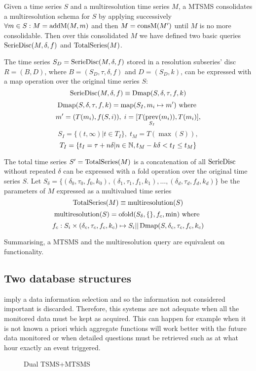 Given a time series $S$ and a multiresolution time series $M$, a MTSMS
consolidates a multiresolution schema for $S$ by applying successively
$\forall m \in S: M=\operatorname{addM}(M,m)$ and then $M=\operatorname{consM}(M')$ until $M$ is
no more consolidable. Then over this consolidated $M$ we have defined
two basic queries $\operatorname{SerieDisc}(M,\delta,f)$ and $\operatorname{TotalSeries}(M)$.

The time series $S_D=\operatorname{SerieDisc}(M,\delta,f)$ stored in a resolution
subseries' disc $R=(B,D)$, where $B=(S_D,\tau,\delta,f)$ and
$D=(S_D,k)$, can be expressed with a map operation over the original
time series $S$:
\[
\operatorname{SerieDisc}(M,\delta,f) \equiv \operatorname{Dmap}(S,\delta,\tau,f,k)
\]
\[
\operatorname{Dmap}(S,\delta,\tau,f,k) = \operatorname*{map}(S_I, m_i\mapsto m') \text{ where }
\]
\[
 m' = (T(m_i), f(S, i)),\;  i = [T(\operatorname*{prev}_{S_I}(m_i)),T(m_i)],
\]
\[
 S_I = \{ (t,\infty) | t\in T_I  \},\;  t_M = T(\max(S)),
\]
\[
T_I = \{ t_I = \tau+n\delta | n\in\mathbb{N}, t_M - k\delta < t_I \leq t_M \}
\]


The total time series $S'=\operatorname{TotalSeries}(M)$ is a concatenation of all
$\operatorname{SerieDisc}$ without repeated $\delta$ can be expressed with a fold
operation over the original time series $S$. Let $S_\delta = \{
(\delta_0,\tau_0,f_0,k_0), (\delta_1,\tau_1,f_1,k_1), \ldots,
(\delta_d,\tau_d,f_d,k_d)\}$ be the parameters of $M$ expressed as a
multivalued time series 
\[
\operatorname{TotalSeries}(M) \equiv \operatorname{multiresolution}(S)
\]
\[
\operatorname{multiresolution}(S) = \operatorname*{ofold}(S_\delta,\{\},f_c,\min) \text{ where }
\]
\[
f_c: S_i \times (\delta_c,\tau_c,f_c,k_c) \mapsto S_i ||
\operatorname{Dmap}(S,\delta_c,\tau_c,f_c,k_c)
\]



Summarising, a MTSMS and the multiresolution query are equivalent on
functionality.



\subsection{Two database structures}

 imply a data information selection and so the information
not considered important is discarded.  Therefore, this systems are
not adequate when all the monitored data must be kept as
acquired. This can happen for example when it is not known a priori
which aggregate functions will work better with the future data
monitored or when detailed questions must be retrieved such as at what
hour exactly an event triggered. 

\begin{figure}
  \centering
  
  \caption{Dual TSMS+MTSMS}
  \label{fig:model:mtsms-tsms}
\end{figure}

